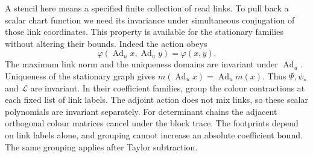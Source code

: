 \documentclass[11pt,reqno]{amsart}
\numberwithin{equation}{section}
\theoremstyle{definition}
\theoremstyle{remark}
\begin{document}
A stencil here means a specified finite collection
of read links.
To pull back a scalar chart function we need its
invariance under simultaneous conjugation of those
link coordinates.
This property is available for the stationary
families without altering their bounds.
Indeed the action obeys
\[
       \varphi(\operatorname{Ad}_u x,
                            \operatorname{Ad}_u y)=\varphi(x,y).
\]
The maximum link norm and the uniqueness domains
are invariant under \(\operatorname{Ad}_u\).
Uniqueness of the stationary graph gives
\(m(\operatorname{Ad}_u x)=\operatorname{Ad}_um(x)\).
Thus \(\Psi,\psi_*\) and \(\mathcal L\) are invariant.
In their coefficient families, group the colour
contractions at each fixed list of link labels.
The adjoint action does not mix links, so these
scalar polynomials are invariant separately.
For determinant chains the adjacent orthogonal
colour matrices cancel under the block trace.
The footprints depend on link labels alone, and
grouping cannot increase an absolute coefficient
bound. The same grouping applies after Taylor
subtraction.
\end{document}

